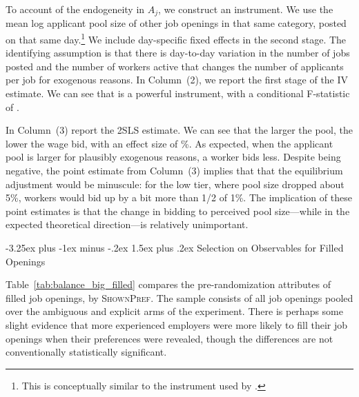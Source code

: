 \documentclass[12pt]{article}
\makeatletter
\renewcommand{\subsection}{%
  \@startsection{subsection}{2}{\z@}%
  {-3.25ex plus -1ex minus -.2ex}%
  {1.5ex plus .2ex}%
  {\normalfont\large\bfseries}%
}
\makeatother
\begin{document}


To account of the endogeneity in $A_j$, we construct an instrument. 
We use the mean log applicant pool size of other job openings in that same category, posted on that same day.\footnote{
  This is conceptually similar to the instrument used by \cite{camerer1997labor}. 
}
We include day-specific fixed effects in the second stage.
The identifying assumption is that there is day-to-day variation in the number of jobs posted and the number of workers active that changes the number of applicants per job for exogenous reasons.
In Column~(2), we report the first stage of the IV estimate.
We can see that is a powerful instrument, with a conditional F-statistic of \IVcondFstat{}. 

In Column~(3) report the 2SLS estimate.
We can see that the larger the pool, the lower the wage bid, with an effect size of \PoolSizeIV{}\%. 
As expected, when the applicant pool is larger for plausibly exogenous reasons, a worker bids less.
Despite being negative, the point estimate from Column~(3) implies that that the equilibrium adjustment would be minuscule: 
 for the low tier, where pool size dropped about 5\%, workers would bid up by a bit more than 1/2 of 1\%. 
The implication of these point estimates is that the change in bidding to perceived pool size---while in the expected theoretical direction---is relatively unimportant.




\subsection{Selection on Observables for Filled Openings} 
\label{supp_app:soo}

Table~\ref{tab:balance_big_filled} compares the pre-randomization attributes of filled job openings, by \textsc{ShownPref}.
The sample consists of all job openings pooled over the ambiguous and explicit arms of the experiment.
There is perhaps some slight evidence that more experienced employers were more likely to fill their job openings when their preferences were revealed, though the differences are not conventionally statistically significant.
\end{document}
